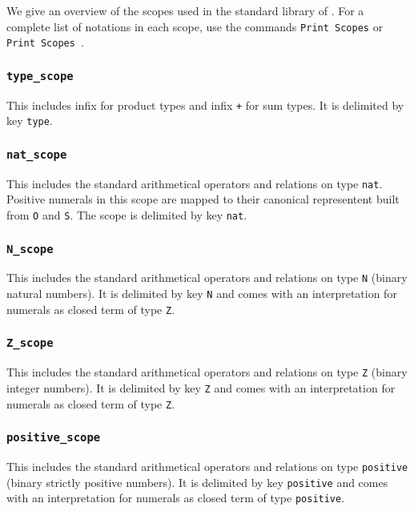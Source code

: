 We give an overview of the scopes used in the standard library of
{\Coq}. For a complete list of notations in each scope, use the
commands {\tt Print Scopes} or {\tt Print Scopes {\scope}}.

\subsubsection{\tt type\_scope}

This includes infix {\tt *} for product types and infix {\tt +} for
sum types. It is delimited by key {\tt type}.

\subsubsection{\tt nat\_scope}

This includes the standard arithmetical operators and relations on
type {\tt nat}. Positive numerals in this scope are mapped to their
canonical representent built from {\tt O} and {\tt S}. The scope is
delimited by key {\tt nat}.

\subsubsection{\tt N\_scope}

This includes the standard arithmetical operators and relations on
type {\tt N} (binary natural numbers). It is delimited by key {\tt N}
and comes with an interpretation for numerals as closed term of type {\tt Z}.

\subsubsection{\tt Z\_scope}

This includes the standard arithmetical operators and relations on
type {\tt Z} (binary integer numbers). It is delimited by key {\tt Z} 
and comes with an interpretation for numerals as closed term of type {\tt Z}.

\subsubsection{\tt positive\_scope}

This includes the standard arithmetical operators and relations on
type {\tt positive} (binary strictly positive numbers). It is
delimited by key {\tt positive} and comes with an interpretation for
numerals as closed term of type {\tt positive}.

